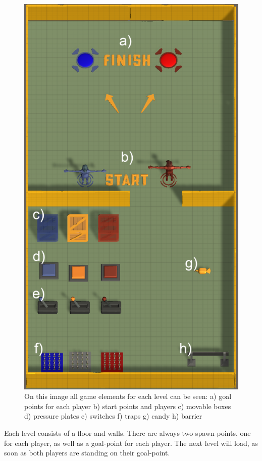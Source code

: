 \begin{figure}
    \centering
    \includegraphics[scale=0.4]{images/lobby_game_elements.png}
    \caption{On this image all game elements for each level can be seen:
    a) goal points for each player b) start points and players c) movable boxes d) pressure plates e) switches f) traps g) candy h) barrier}
    \label{fig:game elements}
\end{figure}


Each level consists of a floor and walls. There are always two spawn-points, one for each player, as well as a goal-point for each player. The next level will load, as soon as both players are standing on their goal-point.


